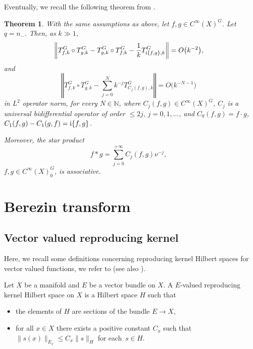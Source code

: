 \documentclass[10pt,a4paper]{amsart}
\numberwithin{equation}{section}
\newtheorem{Theorem}{Theorem}[section]
\newcommand{\norm}[1]{\left\Vert#1\right\Vert}
\begin{document}
Eventually, we recall the following theorem from \cite{gh}.
	
	 \begin{Theorem} \label{thm:compositionFouriercomponents}
	 	With the same assumptions as above, let $f, g\in{C}^\infty(X)^G$. Let $q=n_-$. Then, as $k\gg1$,
	 	\[%
	 		\norm{T^G_{f,k}\circ T^G_{g,k}-T^G_{g,k}\circ T^G_{f,k}-\frac{1}{k} T^G_{ {\rm i} \{f,g\},k}}=O\bigl(k^{-2}\bigr),\]
	 	and
	 	\[%
	 		\norm{T^G_{f,k}\circ T^G_{g,k}-\sum^N_{j=0}k^{-j} T^G_{C_j(f,g),k}}=O\bigl(k^{-N-1}\bigr)
	 	\]
	 	in $L^2$ operator norm, for every $N\in\mathbb N$, where $C_j(f,g)\in{C}^\infty(X)^G$,
	 	$C_j$ is a universal bidifferential operator of order $\leq 2j$, $j=0,1,\dots$, and
$C_{0}(f,g)=f\cdot g $, $
	 			C_{1}(f,g)-C_{1}(g,f)= {\rm i} \{f,g\}$.
	 	
	 	Moreover, the star product
	 	\[%
	 		f*g= \sum_{j=0}^{+\infty} C_{j}(f,g) \nu^{-j} ,
	 	\]
	 	$f, g\in{C}^\infty(X)^G_0$, is associative.
	 \end{Theorem}

\section{Berezin transform}
	
\subsection{Vector valued reproducing kernel}
	
Here, we recall some definitions concerning reproducing kernel Hilbert spaces for vector valued functions, we refer to \cite{bm,pe} (see also \cite[Section~2]{cvt}).
	
\begin{Definition}Let $X$ be a manifold and $E$ be a vector bundle on $X$. A $E$-valued reproducing kernel Hilbert space on $X$ is a Hilbert space $H$ such that
		\begin{itemize}\itemsep=0pt
			\item[(1)] the elements of $H$ are sections of the bundle $E\rightarrow X$,
			\item[(2)] for all $x\in X$ there exists a positive constant $C_x$ such that
			$\lVert s(x)\rVert_{E_x} \leq C_x \lVert s\rVert_H $ for each~${s\in H}$.
		\end{itemize}
	\end{Definition}
	
\end{document}
